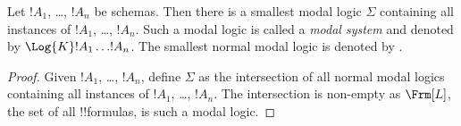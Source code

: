 \documentclass[../../../include/open-logic-section]{subfiles}
\begin{document}


\begin{prop}
  Let $!A_1$, \dots, $!A_n$ be schemas. Then there is a
  smallest modal logic $\Sigma$ containing all instances of
  $!A_1$, \dots, $!A_n$. Such a modal logic is called a
  \emph{modal system} and denoted by $\Log{K} !A_1 \dots
  !A_n$. The smallest normal modal logic is denoted by
  .
\end{prop}

\begin{proof}
  Given $!A_1$, \dots, $!A_n$, define $\Sigma$ as the
  intersection of all normal modal logics containing all instances of
  $!A_1$, \dots, $!A_n$. The intersection is non-empty as
  $\Frm[L]$, the set of all !!{formula}s, is such a modal
  logic.
\end{proof}
\end{document}
